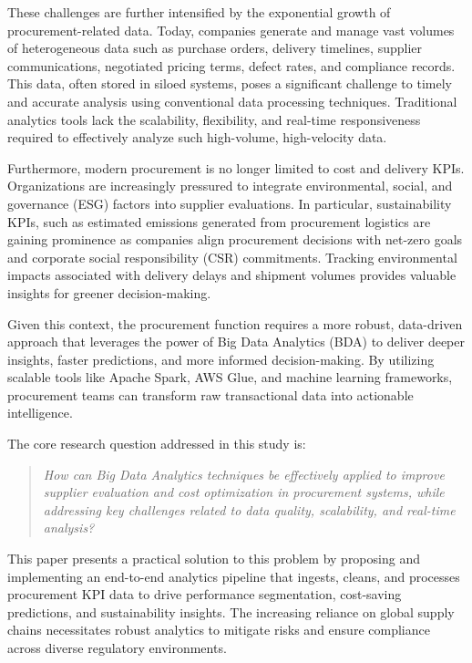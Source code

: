 \documentclass[10pt, twocolumn]{article}
\begin{document}
These challenges are further intensified by the exponential growth of procurement-related data. Today, companies generate and manage vast volumes of heterogeneous data such as purchase orders, delivery timelines, supplier communications, negotiated pricing terms, defect rates, and compliance records. This data, often stored in siloed systems, poses a significant challenge to timely and accurate analysis using conventional data processing techniques. Traditional analytics tools lack the scalability, flexibility, and real-time responsiveness required to effectively analyze such high-volume, high-velocity data.

Furthermore, modern procurement is no longer limited to cost and delivery KPIs. Organizations are increasingly pressured to integrate environmental, social, and governance (ESG) factors into supplier evaluations. In particular, sustainability KPIs, such as estimated emissions generated from procurement logistics are gaining prominence as companies align procurement decisions with net-zero goals and corporate social responsibility (CSR) commitments. Tracking environmental impacts associated with delivery delays and shipment volumes provides valuable insights for greener decision-making.

Given this context, the procurement function requires a more robust, data-driven approach that leverages the power of Big Data Analytics (BDA) to deliver deeper insights, faster predictions, and more informed decision-making. By utilizing scalable tools like Apache Spark, AWS Glue, and machine learning frameworks, procurement teams can transform raw transactional data into actionable intelligence.

The core research question addressed in this study is:

\begin{quote}
\textit{How can Big Data Analytics techniques be effectively applied to improve supplier evaluation and cost optimization in procurement systems, while addressing key challenges related to data quality, scalability, and real-time analysis?}
\end{quote}

This paper presents a practical solution to this problem by proposing and implementing an end-to-end analytics pipeline that ingests, cleans, and processes procurement KPI data to drive performance segmentation, cost-saving predictions, and sustainability insights.
The increasing reliance on global supply chains necessitates robust analytics to mitigate risks and ensure compliance across diverse regulatory environments.
\end{document}
